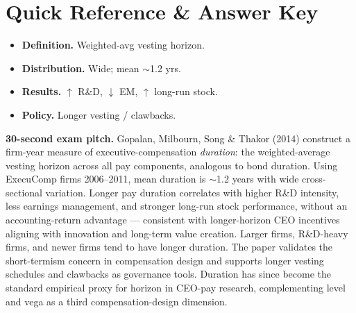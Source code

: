 \documentclass[11pt]{article}
\begin{document}
\section*{Quick Reference \& Answer Key}
\begin{answerbox}
\begin{itemize}
\item \textbf{Definition.} Weighted-avg vesting horizon.
\item \textbf{Distribution.} Wide; mean $\sim$1.2 yrs.
\item \textbf{Results.} $\uparrow$ R\&D, $\downarrow$ EM, $\uparrow$ long-run stock.
\item \textbf{Policy.} Longer vesting / clawbacks.
\end{itemize}
\end{answerbox}

\begin{keybox}
\textbf{30-second exam pitch.} Gopalan, Milbourn, Song \& Thakor (2014) construct a firm-year measure of executive-compensation \emph{duration}: the weighted-average vesting horizon across all pay components, analogous to bond duration. Using ExecuComp firms 2006--2011, mean duration is $\sim$1.2 years with wide cross-sectional variation. Longer pay duration correlates with higher R\&D intensity, less earnings management, and stronger long-run stock performance, without an accounting-return advantage --- consistent with longer-horizon CEO incentives aligning with innovation and long-term value creation. Larger firms, R\&D-heavy firms, and newer firms tend to have longer duration. The paper validates the short-termism concern in compensation design and supports longer vesting schedules and clawbacks as governance tools. Duration has since become the standard empirical proxy for horizon in CEO-pay research, complementing level and vega as a third compensation-design dimension.
\end{keybox}
\end{document}
